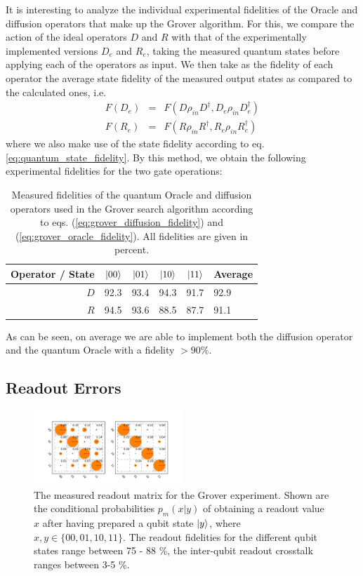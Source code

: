 It is interesting to analyze the individual experimental fidelities of the Oracle and diffusion operators that make up the Grover algorithm. For this, we compare the action of the ideal operators $D$ and $R$ with that of the experimentally implemented versions $D_{e}$ and $R_{e}$, taking the measured quantum states before applying each of the operators as input. We then take as the fidelity of each operator the average state fidelity of the measured output states as compared to the calculated ones, i.e.
%
\begin{eqnarray}
F(D_{e}) & = & F(D\rho_{in}D^{\dagger},D_e \rho_{in} D_{e}^{\dagger}) \label{eq:grover_diffusion_fidelity} \\
F(R_{e}) & = & F(R\rho_{in}R^{\dagger},R_e \rho_{in} R_{e}^{\dagger}) \label{eq:grover_oracle_fidelity}
\end{eqnarray}
%
where we also make use of the state fidelity according to eq. \ref{eq:quantum_state_fidelity}. By this method, we obtain the following experimental fidelities for the two gate operations:

\begin{table}[ht!]
\centering
\begin{tabular}{r|rrrr|l}
Operator / State & $\left| 00 \right>$ & $\left| 01 \right>$ & $\left| 10 \right>$ & $\left| 11 \right>$ & Average \\ \hline 
$D$ & 92.3 & 93.4 & 94.3 & 91.7 & 92.9 \\
$R$ & 94.5 & 93.6 & 88.5 & 87.7 & 91.1
\end{tabular}
\caption[Measured fidelities of the quantum Oracle and diffusion operators used in the Grover search algorithm]{Measured fidelities of the quantum Oracle and diffusion operators used in the Grover search algorithm according to eqs. (\ref{eq:grover_diffusion_fidelity}) and (\ref{eq:grover_oracle_fidelity}). All fidelities are given in percent.}
\end{table}

As can be seen, on average we are able to implement both the diffusion operator and the quantum Oracle with a fidelity $>90\%$.
\subsection{Readout Errors}

\begin{figure}
	\centering
\includegraphics[width=0.5\textwidth]{"./data/ct5/2011_04_21 - grover and tomo/good_data/readout only"}
	\caption{The measured readout matrix for the Grover experiment. Shown are the conditional probabilities $p_m(x|y)$ of obtaining a readout value $x$ after having prepared a qubit state $\left| y \right>$, where $x,y\in\{00,01,10,11\}$. The readout fidelities for the different qubit states range between 75 - 88 \%, the inter-qubit readout crosstalk ranges between 3-5 \%.}
	\label{fig:GroverReadoutMatrix}
\end{figure}

